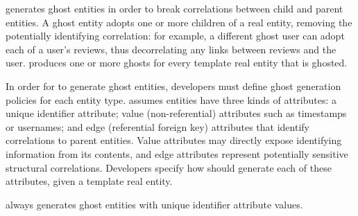 \sys generates ghost entities in order to break correlations between child and parent entities.  A
ghost entity adopts one or more children of a real entity, removing the potentially identifying
correlation: for example, a different ghost user can adopt each of a user's reviews, thus
decorrelating any links between reviews and the user. \sys produces one or more ghosts for every
template real entity that is ghosted. 

In order for \sys to generate ghost entities, developers must define ghost generation policies for
each entity type.  \sys assumes entities have three kinds of attributes: a unique identifier
attribute; value (non-referential) attributes such as timestamps or usernames; and edge (referential
foreign key) attributes that identify correlations to parent entities.  Value attributes may
directly expose identifying information from its contents, and edge attributes represent potentially
sensitive structural correlations.  Developers specify how \sys should generate each of these
attributes, given a template real entity.

\sys always generates ghost entities with unique identifier attribute values.

